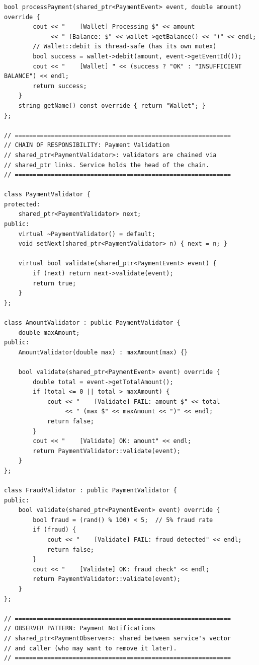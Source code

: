 \documentclass[11pt,a4paper]{article}
\begin{document}
\begin{lstlisting}[title={\texttt{strategies.hpp}}]
    bool processPayment(shared_ptr<PaymentEvent> event, double amount) override {
        cout << "    [Wallet] Processing $" << amount
             << " (Balance: $" << wallet->getBalance() << ")" << endl;
        // Wallet::debit is thread-safe (has its own mutex)
        bool success = wallet->debit(amount, event->getEventId());
        cout << "    [Wallet] " << (success ? "OK" : "INSUFFICIENT BALANCE") << endl;
        return success;
    }
    string getName() const override { return "Wallet"; }
};

// ============================================================
// CHAIN OF RESPONSIBILITY: Payment Validation
// shared_ptr<PaymentValidator>: validators are chained via
// shared_ptr links. Service holds the head of the chain.
// ============================================================

class PaymentValidator {
protected:
    shared_ptr<PaymentValidator> next;
public:
    virtual ~PaymentValidator() = default;
    void setNext(shared_ptr<PaymentValidator> n) { next = n; }

    virtual bool validate(shared_ptr<PaymentEvent> event) {
        if (next) return next->validate(event);
        return true;
    }
};

class AmountValidator : public PaymentValidator {
    double maxAmount;
public:
    AmountValidator(double max) : maxAmount(max) {}

    bool validate(shared_ptr<PaymentEvent> event) override {
        double total = event->getTotalAmount();
        if (total <= 0 || total > maxAmount) {
            cout << "    [Validate] FAIL: amount $" << total
                 << " (max $" << maxAmount << ")" << endl;
            return false;
        }
        cout << "    [Validate] OK: amount" << endl;
        return PaymentValidator::validate(event);
    }
};

class FraudValidator : public PaymentValidator {
public:
    bool validate(shared_ptr<PaymentEvent> event) override {
        bool fraud = (rand() % 100) < 5;  // 5% fraud rate
        if (fraud) {
            cout << "    [Validate] FAIL: fraud detected" << endl;
            return false;
        }
        cout << "    [Validate] OK: fraud check" << endl;
        return PaymentValidator::validate(event);
    }
};

// ============================================================
// OBSERVER PATTERN: Payment Notifications
// shared_ptr<PaymentObserver>: shared between service's vector
// and caller (who may want to remove it later).
// ============================================================


\end{lstlisting}
\end{document}
